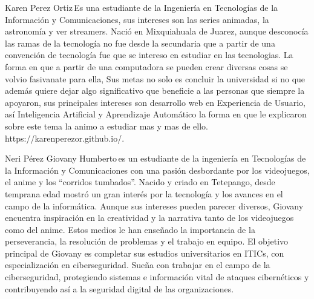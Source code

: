 \documentclass{IEEEcsmag}
\begin{document}
\begin{IEEEbiography}{Karen Perez Ortiz}{\,}Es una estudiante de la Ingeniería en Tecnologías de la Información y Comunicaciones, sus intereses son las series animadas, la astronomía y ver streamers. Nació en Mixquiahuala de Juarez, aunque desconocía las ramas de la tecnología no fue desde la secundaria que a partir de una convención de tecnología fue que se intereso en estudiar en las tecnologias. La forma en que a partir de una computadora se pueden crear diversas cosas se volvio fasivanate para ella, Sus metas no solo es concluir la universidad si no que además quiere dejar algo significativo que beneficie a las personas que siempre la apoyaron, sus principales intereses son desarrollo web en Experiencia de Usuario, así Inteligencia Artificial y Aprendizaje Automático la forma en que le explicaron sobre este tema la animo a estudiar mas y mas de ello.
        https://karenperezor.github.io/.
\end{IEEEbiography}
\begin{IEEEbiography}{Neri Pérez Giovany Humberto}{\,}es un estudiante de la ingeniería en Tecnologías de la Información y Comunicaciones con una pasión desbordante por los videojuegos, el anime y los ``corridos tumbados''. Nacido y criado en  Tetepango, desde temprana edad mostró un gran interés por la tecnología y los avances en el campo de la informática. Aunque sus intereses pueden parecer diversos, Giovany encuentra inspiración en la creatividad y la narrativa tanto de los videojuegos como del anime. Estos medios le han enseñado la importancia de la perseverancia, la resolución de problemas y el trabajo en equipo. El objetivo principal de Giovany es completar sus estudios universitarios en ITICs, con especialización en ciberseguridad. Sueña con trabajar en el campo de la ciberseguridad, protegiendo sistemas e información vital de ataques cibernéticos y contribuyendo así a la seguridad digital de las organizaciones.
\end{IEEEbiography}
\end{document}
